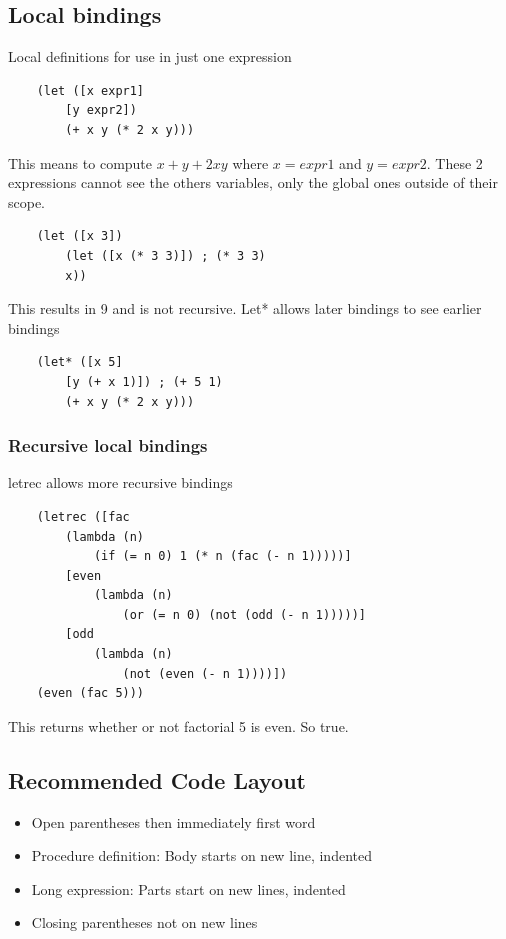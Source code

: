 \documentclass[12pt]{article}
\begin{document}
\subsection{Local bindings}

Local definitions for use in just one expression

\begin{lstlisting}
	(let ([x expr1]
		[y expr2])
		(+ x y (* 2 x y)))
\end{lstlisting}
This means to compute $x+y+2xy$ where $x=expr1$ and $y=expr2$. These 2 expressions cannot see the others variables, only the global ones outside of their scope.
\begin{lstlisting}
	(let ([x 3])
		(let ([x (* 3 3)]) ; (* 3 3)
		x))
\end{lstlisting}
This results in 9 and is not recursive. Let* allows later bindings to see earlier bindings
\begin{lstlisting}
	(let* ([x 5]
		[y (+ x 1)]) ; (+ 5 1)
		(+ x y (* 2 x y)))
\end{lstlisting}
\subsubsection{Recursive local bindings}

letrec allows more recursive bindings

\begin{lstlisting}
	(letrec ([fac
		(lambda (n)
			(if (= n 0) 1 (* n (fac (- n 1)))))]
		[even
			(lambda (n)
				(or (= n 0) (not (odd (- n 1)))))]
		[odd
			(lambda (n)
				(not (even (- n 1))))])
	(even (fac 5)))
\end{lstlisting}
This returns whether or not factorial 5 is even. So true.

\subsection{Recommended Code Layout}

\begin{itemize}
	\item{Open parentheses then immediately first word}
	\item{Procedure definition: Body starts on new line, indented}
	\item{Long expression: Parts start on new lines, indented}
	\item{Closing parentheses not on new lines}
\end{itemize}

\newpage
\end{document}
